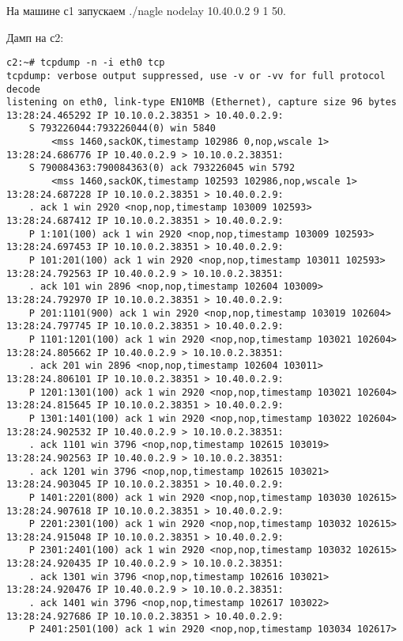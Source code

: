 \documentclass[a4paper,12pt]{article}
\begin{document}
На машине с1 запускаем ./nagle nodelay 10.40.0.2 9 1 50.

Дамп на с2:
\begin{Verbatim}
c2:~# tcpdump -n -i eth0 tcp
tcpdump: verbose output suppressed, use -v or -vv for full protocol decode
listening on eth0, link-type EN10MB (Ethernet), capture size 96 bytes
13:28:24.465292 IP 10.10.0.2.38351 > 10.40.0.2.9: 
    S 793226044:793226044(0) win 5840 
        <mss 1460,sackOK,timestamp 102986 0,nop,wscale 1>
13:28:24.686776 IP 10.40.0.2.9 > 10.10.0.2.38351: 
    S 790084363:790084363(0) ack 793226045 win 5792 
        <mss 1460,sackOK,timestamp 102593 102986,nop,wscale 1>
13:28:24.687228 IP 10.10.0.2.38351 > 10.40.0.2.9: 
    . ack 1 win 2920 <nop,nop,timestamp 103009 102593>
13:28:24.687412 IP 10.10.0.2.38351 > 10.40.0.2.9: 
    P 1:101(100) ack 1 win 2920 <nop,nop,timestamp 103009 102593>
13:28:24.697453 IP 10.10.0.2.38351 > 10.40.0.2.9: 
    P 101:201(100) ack 1 win 2920 <nop,nop,timestamp 103011 102593>
13:28:24.792563 IP 10.40.0.2.9 > 10.10.0.2.38351: 
    . ack 101 win 2896 <nop,nop,timestamp 102604 103009>
13:28:24.792970 IP 10.10.0.2.38351 > 10.40.0.2.9: 
    P 201:1101(900) ack 1 win 2920 <nop,nop,timestamp 103019 102604>
13:28:24.797745 IP 10.10.0.2.38351 > 10.40.0.2.9: 
    P 1101:1201(100) ack 1 win 2920 <nop,nop,timestamp 103021 102604>
13:28:24.805662 IP 10.40.0.2.9 > 10.10.0.2.38351: 
    . ack 201 win 2896 <nop,nop,timestamp 102604 103011>
13:28:24.806101 IP 10.10.0.2.38351 > 10.40.0.2.9: 
    P 1201:1301(100) ack 1 win 2920 <nop,nop,timestamp 103021 102604>
13:28:24.815645 IP 10.10.0.2.38351 > 10.40.0.2.9: 
    P 1301:1401(100) ack 1 win 2920 <nop,nop,timestamp 103022 102604>
13:28:24.902532 IP 10.40.0.2.9 > 10.10.0.2.38351: 
    . ack 1101 win 3796 <nop,nop,timestamp 102615 103019>
13:28:24.902563 IP 10.40.0.2.9 > 10.10.0.2.38351: 
    . ack 1201 win 3796 <nop,nop,timestamp 102615 103021>
13:28:24.903045 IP 10.10.0.2.38351 > 10.40.0.2.9: 
    P 1401:2201(800) ack 1 win 2920 <nop,nop,timestamp 103030 102615>
13:28:24.907618 IP 10.10.0.2.38351 > 10.40.0.2.9: 
    P 2201:2301(100) ack 1 win 2920 <nop,nop,timestamp 103032 102615>
13:28:24.915048 IP 10.10.0.2.38351 > 10.40.0.2.9: 
    P 2301:2401(100) ack 1 win 2920 <nop,nop,timestamp 103032 102615>
13:28:24.920435 IP 10.40.0.2.9 > 10.10.0.2.38351: 
    . ack 1301 win 3796 <nop,nop,timestamp 102616 103021>
13:28:24.920476 IP 10.40.0.2.9 > 10.10.0.2.38351: 
    . ack 1401 win 3796 <nop,nop,timestamp 102617 103022>
13:28:24.927686 IP 10.10.0.2.38351 > 10.40.0.2.9: 
    P 2401:2501(100) ack 1 win 2920 <nop,nop,timestamp 103034 102617>

\end{Verbatim}
\end{document}
